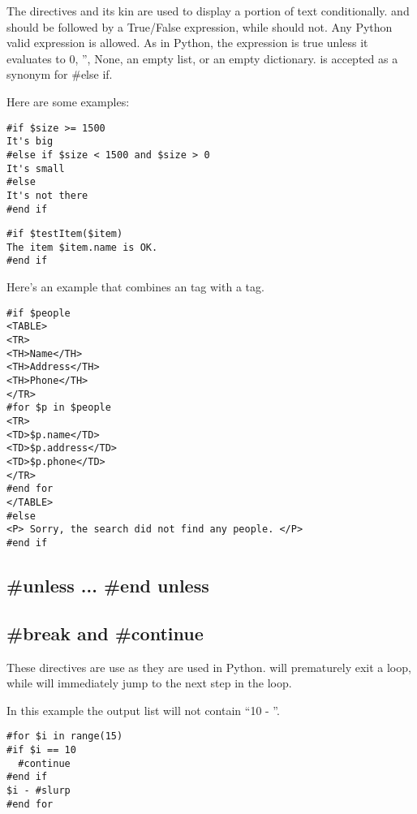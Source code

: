 The  directives and its kin are used to display a portion of text
conditionally.  and  should be followed by a
True/False expression, while  should not.  Any Python valid
expression is allowed.  As in Python, the expression is true unless it evaluates
to 0, '', None, an empty list, or an empty dictionary.  is accepted
as a synonym for {\#else if}.

Here are some examples:
\begin{verbatim}
#if $size >= 1500
It's big
#else if $size < 1500 and $size > 0 
It's small
#else
It's not there
#end if
\end{verbatim}

\begin{verbatim}
#if $testItem($item)
The item $item.name is OK.
#end if
\end{verbatim}

Here's an example that combines an  tag with a  tag.
\begin{verbatim}
#if $people
<TABLE>
<TR>
<TH>Name</TH>
<TH>Address</TH>
<TH>Phone</TH>
</TR>
#for $p in $people
<TR>
<TD>$p.name</TD>
<TD>$p.address</TD>
<TD>$p.phone</TD>
</TR>
#end for
</TABLE>
#else
<P> Sorry, the search did not find any people. </P>
#end if
\end{verbatim}


\subsection{\#unless ... \#end unless}
\label{flowControl.unless}


\subsection{\#break and \#continue}
\label{flowControl.break}

These directives are use as they are used in Python.  will
prematurely exit a  loop, while  will immediately
jump to the next step in the  loop.

In this example the output list will not contain ``10 - ''. 
\begin{verbatim}
#for $i in range(15)
#if $i == 10
  #continue
#end if
$i - #slurp
#end for
\end{verbatim}


